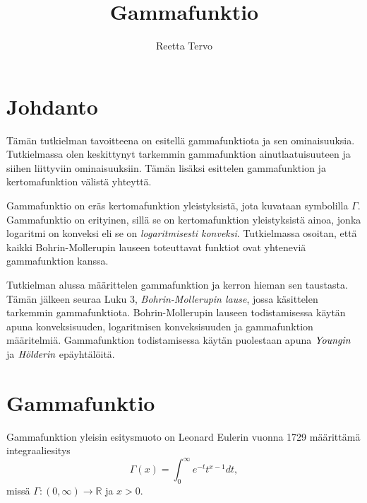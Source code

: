 \documentclass[12pt]{article}
\title{Gammafunktio}
\author{Reetta Tervo}
\theoremstyle{definition}
\theoremstyle{plain}
\numberwithin{equation}{section}
\begin{document}
\maketitle

\newpage
\tableofcontents

\newpage
\section{Johdanto}
\onehalfspacing
Tämän tutkielman tavoitteena on esitellä gammafunktiota ja sen ominaisuuksia. Tutkielmassa olen keskittynyt tarkemmin gammafunktion ainutlaatuisuuteen ja siihen liittyviin ominaisuuksiin. Tämän lisäksi esittelen gammafunktion ja kertomafunktion välistä yhteyttä.

Gammafunktio on eräs kertomafunktion yleistyksistä, jota kuvataan symbolilla $\Gamma$. Gammafunktio on erityinen, sillä se on kertomafunktion yleistyksistä ainoa, jonka logaritmi on konveksi eli se on \emph{logaritmisesti konveksi}. Tutkielmassa osoitan, että kaikki Bohrin-Mollerupin lauseen toteuttavat funktiot ovat yhteneviä gammafunktion kanssa.

Tutkielman alussa määrittelen gammafunktion ja kerron hieman sen taustasta. Tämän jälkeen seuraa Luku 3, \emph{Bohrin-Mollerupin lause}, jossa käsittelen tarkemmin gammafunktiota. Bohrin-Mollerupin lauseen todistamisessa käytän apuna konveksisuuden, logaritmisen konveksisuuden ja gammafunktion määritelmiä. Gammafunktion todistamisessa käytän puolestaan apuna $\emph{Youngin}$ ja $\emph{Hölderin}$ epäyhtälöitä.

\newpage

\section{Gammafunktio}
Gammafunktion yleisin esitysmuoto on Leonard Eulerin vuonna 1729 määrittämä integraaliesitys
\begin{equation}\label{yhtalo:gammafunktio}
     \Gamma(x) = \int_{0}^{\infty} e^{-t} t^{x-1} dt,
\end{equation}
missä $\Gamma:(0,\infty)\rightarrow\mathbb{R}$ ja $x>0$.
\end{document}
